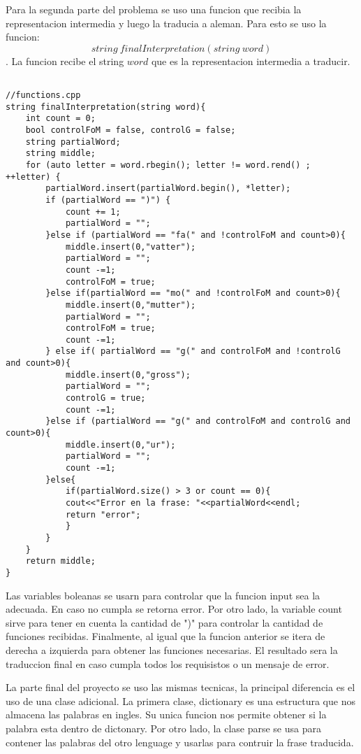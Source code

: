 \documentclass[conference]{IEEEtran}
\begin{document}
Para la segunda parte del problema se uso una funcion que recibia la representacion intermedia y luego la traducia a aleman. Para esto se uso la funcion: 
$$string\  finalInterpretation(string\  word) $$
. La funcion recibe el string $word$ que es la representacion intermedia a traducir. 

\begin{lstlisting}
	
//functions.cpp
string finalInterpretation(string word){
	int count = 0;
	bool controlFoM = false, controlG = false;
	string partialWord;
	string middle;
	for (auto letter = word.rbegin(); letter != word.rend() ; ++letter) {
		partialWord.insert(partialWord.begin(), *letter);
		if (partialWord == ")") {
			count += 1;
			partialWord = "";
		}else if (partialWord == "fa(" and !controlFoM and count>0){
			middle.insert(0,"vatter");
			partialWord = "";
			count -=1;
			controlFoM = true;
		}else if(partialWord == "mo(" and !controlFoM and count>0){
			middle.insert(0,"mutter");
			partialWord = "";
			controlFoM = true;
			count -=1;
		} else if( partialWord == "g(" and controlFoM and !controlG and count>0){
			middle.insert(0,"gross");
			partialWord = "";
			controlG = true;
			count -=1;
		}else if (partialWord == "g(" and controlFoM and controlG and count>0){
			middle.insert(0,"ur");
			partialWord = "";
			count -=1;
		}else{
			if(partialWord.size() > 3 or count == 0){
			cout<<"Error en la frase: "<<partialWord<<endl;
			return "error";
			}
		}
	}
	return middle;
}

\end{lstlisting}

Las variables boleanas se usarn para controlar que la funcion input sea la adecuada. En caso no cumpla se retorna error. Por otro lado, la variable count sirve para tener en cuenta la cantidad de ")" para controlar la cantidad de funciones recibidas. Finalmente, al igual que la funcion anterior se itera de derecha a izquierda para obtener las funciones necesarias. El resultado sera la traduccion final en caso cumpla todos los requisistos o un mensaje de error.

La parte final del proyecto se uso las mismas tecnicas, la principal diferencia es el uso de una clase adicional. La primera clase, dictionary es una estructura que nos almacena las palabras en ingles. Su unica funcion nos permite obtener si la palabra esta dentro de dictonary. Por otro lado, la clase parse se usa para contener las palabras del otro lenguage y usarlas para contruir la frase traducida.
\end{document}
